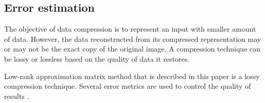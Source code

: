 \subsection{Error estimation}
\label{sec:error}


The objective of data compression is to represent an input with smaller amount of data. However, the data reconstructed from its compressed representation may or may not be the exact copy of the original image. A compression technique can be lossy or lossless based on the quality of data it restores.

Low-rank approximation matrix method that is described in this paper is a lossy compression technique. Several error metrics are used to control the quality of results \cite{SairaBanu2015}.

